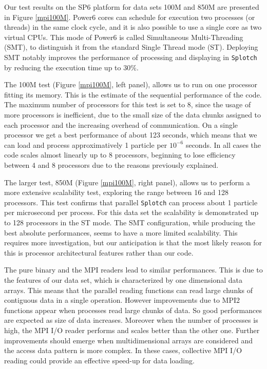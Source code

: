 \documentclass[1p,times]{elsarticle}
\begin{document}
Our test results on the SP6 platform for data sets 100M and 850M
are presented in Figure \ref{mpi100M}.
Power6 cores can schedule for execution two processes (or threads) in the same clock cycle, 
and it is also possible to use a single core as two virtual CPUs. This mode of Power6 
is called Simultaneous Multi-Threading (SMT), to distinguish it from 
the standard Single Thread mode (ST).
Deploying SMT notably improves the performance 
of processing and displaying in {\tt Splotch} by reducing the execution time up to  
$30\%$.

The 100M test (Figure \ref{mpi100M}, left panel), allows us 
to run on one processor fitting its memory. 
This is the estimate of the sequential performance of the code. 
The maximum number of processors for this test is set to 8, since the usage of 
more processors is inefficient, due to the small size 
of the data chunks assigned to each processor and the increasing overhead of communication.
On a single processor we get a best performance of about 123 seconds, which means that 
we can load and process approximatively 1 particle per $10^{-6}$ seconds. 
In all cases the code scales almost linearly up to 8 processors, beginning to lose
efficiency between 4 and 8 processors due to the reasons previously explained. 

The larger test, 850M (Figure \ref{mpi100M}, right panel), 
allows us to perform a more extensive scalability test, 
exploring the range between 16 and 128 processors. This test confirms that parallel
{\tt Splotch} can process about 1 particle per microsecond per process. For this data set the scalability
is demonstrated up to 128 processors in the ST mode. The SMT configuration,
while producing the best absolute performances, seems to have a more limited scalability. 
This requires more investigation, but our anticipation is that the most likely reason for this is processor 
architectural features rather than our code.

The pure binary and the MPI readers lead to similar performances. This is due to the features 
of our data set, which is characterized by one dimensional data arrays. This means
that the parallel reading functions can read large chunks of contiguous data 
in a single operation. However improvements due to MPI2 functions appear when 
processes read large chunks of data. So good performances are expected as size of data increases. 
Moreover when the number of processes is high, the MPI I/O reader performs and scales 
better than the other one. Further improvements should emerge when multidimensional 
arrays are considered and the access data pattern is more complex. 
In these cases, collective MPI I/O reading could provide an effective speed-up for data loading.
\end{document}
